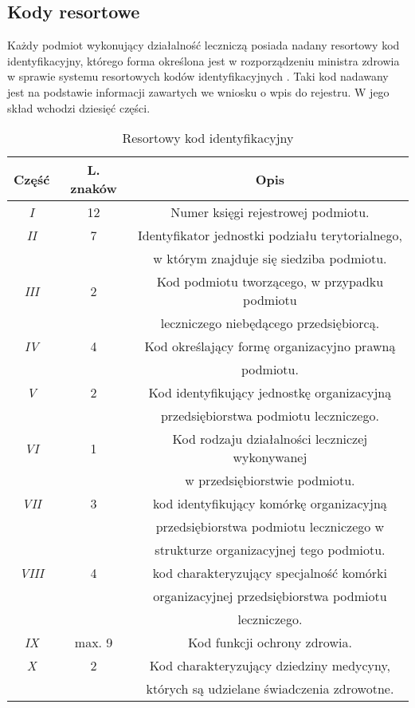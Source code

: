 \subsection{Kody resortowe}
Każdy podmiot wykonujący działalność leczniczą posiada nadany resortowy kod identyfikacyjny, którego forma określona jest w rozporządzeniu ministra zdrowia w sprawie systemu resortowych kodów identyfikacyjnych \cite{mz:rki:online}. Taki kod nadawany jest na podstawie informacji zawartych we wniosku o wpis do rejestru. W jego skład wchodzi dziesięć części.

\begin{table}
\centering
\caption{Resortowy kod identyfikacyjny}
\label{tab:card}
\begin{minipage}{.9\textwidth}
\setlength{\baselineskip}{2mm}
\centering
\begin{tabular}{c|c|c}
Część & L. znaków & Opis \\ \hline
{\em I}   & 12 & Numer księgi rejestrowej podmiotu. \\ \hline
{\em II}  & 7  & Identyfikator jednostki podziału terytorialnego, \\
		  &    & w którym znajduje się siedziba podmiotu. \\ \hline
{\em III} & 2  & Kod podmiotu tworzącego, w przypadku podmiotu \\ 
		  &    & leczniczego niebędącego przedsiębiorcą. \\ \hline
{\em IV}  & 4  & Kod określający formę organizacyjno prawną \\
		  &    & podmiotu. \\ \hline
{\em V}   & 2  & Kod identyfikujący jednostkę organizacyjną \\
		  &    & przedsiębiorstwa podmiotu leczniczego. \\ \hline
{\em VI}  & 1  & Kod rodzaju działalności leczniczej wykonywanej \\
		  &    & w przedsiębiorstwie podmiotu. \\ \hline
{\em VII} & 3  & kod identyfikujący komórkę organizacyjną \\
		  &    & przedsiębiorstwa podmiotu leczniczego w  \\
		  &    & strukturze organizacyjnej tego podmiotu. \\ \hline
{\em VIII}& 4  & kod charakteryzujący specjalność komórki \\		
		  &    & organizacyjnej przedsiębiorstwa podmiotu \\
		  &    & leczniczego. \\ \hline
{\em IX}  & max. 9 & Kod funkcji ochrony zdrowia. \\ \hline
{\em X}   & 2  & Kod charakteryzujący dziedziny medycyny, \\
		  &    & których są udzielane świadczenia zdrowotne. \\ \hline
\end{tabular}
\end{minipage}
\end{table}

